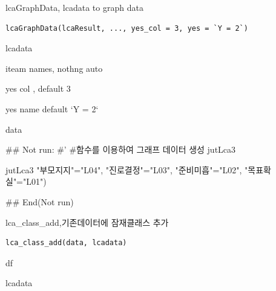 \documentclass[a4paper]{book}
\begin{document}
%
\begin{Description}
lcaGraphData, lcadata to graph data
\end{Description}
%
\begin{Usage}
\begin{verbatim}
lcaGraphData(lcaResult, ..., yes_col = 3, yes = `Y = 2`)
\end{verbatim}
\end{Usage}
%
\begin{Arguments}
\begin{ldescription}
\item[\code{lcaResult}] lcadata

\item[\code{...}] iteam names, nothng auto

\item[\code{yes\_col}] yes col , default 3

\item[\code{yes}] yes name default `Y = 2`
\end{ldescription}
\end{Arguments}
%
\begin{Value}
data
\end{Value}
%
\begin{Examples}
\begin{ExampleCode}
## Not run: 
#'
#함수를 이용하여 그래프 데이터 생성
jutLca3 %

jutLca3 %
                         "부모지지"="L04",
                         "진로결정"="L03",
                         "준비미흡"="L02",
                         "목표확실"="L01")


## End(Not run)

\end{ExampleCode}
\end{Examples}
%
\begin{Description}
lca\_class\_add,기존데이터에 잠재클래스 추가
\end{Description}
%
\begin{Usage}
\begin{verbatim}
lca_class_add(data, lcadata)
\end{verbatim}
\end{Usage}
%
\begin{Arguments}
\begin{ldescription}
\item[\code{data}] df

\item[\code{lcadata}] lcadata
\end{ldescription}
\end{Arguments}
\end{document}
